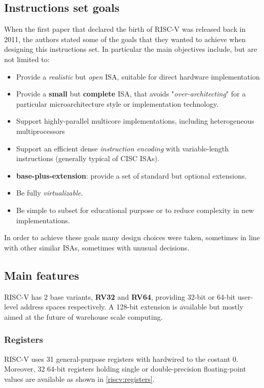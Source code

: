\documentclass[12pt,oneside,a4paper]{article}
\begin{document}
\subsection{Instructions set goals}
When the first paper that declared the birth of RISC-V \cite{risc-v_original} was released back in 2011, the authors stated some of the goals that they wanted to achieve when designing this instructions set. In particular the main objectives include, but are not limited to:
\begin{itemize}
	\item Provide a \textit{realistic} but \textit{open} ISA, suitable for direct hardware implementation
	\item Provide a \textbf{small} but \textbf{complete} ISA, that avoids "\textit{over-architecting}" for a particular microarchitecture style or implementation technology.
	\item Support highly-parallel multicore implementations, including heterogeneous multiprocessors
	\item Support an efficient dense \textit{instruction encoding} with variable-length instructions (generally typical of CISC ISAs).
	\item \textbf{base-plus-extension}: provide a set of standard but optional extensions.
	\item Be fully \textit{virtualizable}.
	\item Be simple to subset for educational purpose or to reduce complexity in new implementations.
\end{itemize}
In order to achieve these goals many design choices were taken, sometimes in line with other similar ISAs, sometimes with unusual decisions.

\subsection{Main features}
RISC-V has 2 base variants, \textbf{RV32} and \textbf{RV64}, providing 32-bit or 64-bit user-level address spaces respectively. A 128-bit extension is available but mostly aimed at the future of warehouse scale computing.
\subsubsection{Registers}
RISC-V uses 31 general-purpose registers  {\selectfont{x1-x31}} with  {\selectfont{x0}} hardwired to the costant 0. Moreover, 32 64-bit registers {\selectfont{f0-f31}} holding single or double-precision floating-point values are available as shown in \cref{riscv:registers}.
\end{document}
